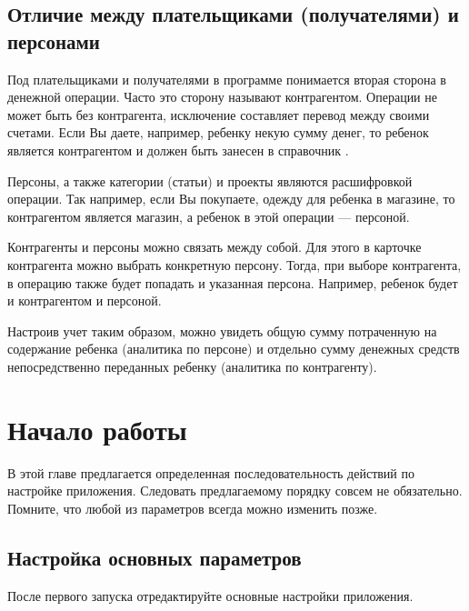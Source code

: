 \documentclass[a4paper,10pt,russian]{sphinxmanual}
\begin{document}
\section{Отличие между плательщиками (получателями) и персонами}
\label{\detokenize{intro:id4}}
Под плательщиками и получателями в программе понимается вторая сторона в денежной операции. Часто это сторону называют
контрагентом. Операции не может быть без контрагента, исключение составляет перевод между своими счетами. Если Вы даете, например,
ребенку некую сумму денег, то ребенок является контрагентом и должен быть занесен в справочник .

Персоны, а также категории (статьи) и проекты являются расшифровкой операции. Так например, если Вы покупаете, одежду для
ребенка в магазине, то контрагентом является магазин, а ребенок в этой операции — персоной.

Контрагенты и персоны можно связать между собой. Для этого в карточке контрагента можно выбрать конкретную персону. Тогда,
при выборе контрагента, в операцию также будет попадать и указанная персона. Например, ребенок будет и контрагентом и персоной.

Настроив учет таким образом, можно увидеть общую сумму потраченную на содержание ребенка (аналитика по персоне)
и отдельно сумму денежных средств непосредственно переданных ребенку (аналитика по контрагенту).


\chapter{Начало работы}
\label{\detokenize{getting-started:id1}}\label{\detokenize{getting-started::doc}}
В этой главе предлагается определенная последовательность действий по настройке приложения. Следовать предлагаемому порядку совсем не обязательно. Помните, что любой из параметров всегда можно изменить позже.


\section{Настройка основных параметров}
\label{\detokenize{getting-started:id2}}
После первого запуска отредактируйте основные настройки приложения.

\noindent{}
\noindent{}
\noindent{}
\end{document}
